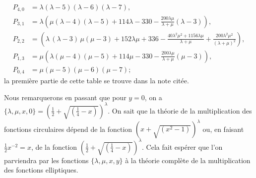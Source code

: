 \documentclass[11pt]{article}
\begin{document}
\[
\begin{aligned}
P_{4,0} &= \lambda(\lambda - 5)(\lambda - 6)(\lambda - 7),\\
P_{3,1} &= \lambda\left(\mu(\lambda - 4)(\lambda - 5) + 114\lambda - 330 - \tfrac{200\lambda\mu}{\lambda+\mu}(\lambda - 3)\right),\\
P_{2,2} &= \left(\lambda\,(\lambda - 3)\,\mu(\mu - 3) + 152\lambda\mu + 336 - \tfrac{40\lambda^{2}\mu^{2} + 1156\lambda\mu}{\lambda+\mu} + \tfrac{200\lambda^{2}\mu^{2}}{(\lambda+\mu)^{2}}\right),\\
P_{1,3} &= \mu\left(\lambda(\mu - 4)(\mu - 5) + 114\mu - 330 - \tfrac{200\lambda\mu}{\lambda+\mu}(\mu - 3)\right),\\
P_{0,4} &= \mu(\mu - 5)(\mu - 6)(\mu - 7);
\end{aligned}
\]
la premi\`ere partie de cette table se trouve dans la note cit\'ee.

Nous remarquerons en passant que pour $y = 0$, on a $\{\lambda, \mu, x, 0\} = (\tfrac{1}{2} + \sqrt{(\tfrac{1}{4} - x)})^{\lambda}$. On sait que la th\'eorie de la multiplication des fonctions circulaires d\'epend de la fonction $(x + \sqrt{(x^{2} - 1)})^{\lambda}$ ou, en faisant $\tfrac{1}{2}x^{-2} = x$, de la fonction $(\tfrac{1}{2} + \sqrt{(\tfrac{1}{4} - x)})^{\lambda}$. Cela fait esp\'erer que l'on parviendra par les fonctions $\{\lambda, \mu, x, y\}$ \`a la th\'eorie compl\`ete de la multiplication des fonctions elliptiques.
\end{document}
